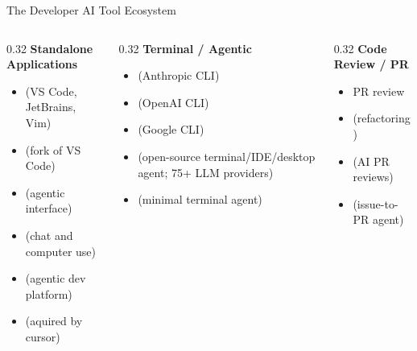 \begin{frame}[shrink=5]{The Developer AI Tool Ecosystem}
  \begin{columns}[T, onlytextwidth]
    \begin{column}{0.32\textwidth}
      \textbf{Standalone Applications}\\[0.3em]
      \begin{itemize}
        \item {} (VS Code, JetBrains, Vim)
        \item {} (fork of VS Code)
        \item {} (agentic interface)
        \item {} (chat and computer use)
        \item {} (agentic dev platform)
        \item \sout{} (aquired by cursor)
      \end{itemize}
    \end{column}
    \hfill
    \begin{column}{0.32\textwidth}
      \textbf{Terminal / Agentic}\\[0.3em]
      \begin{itemize}
        \item {} (Anthropic CLI)
        \item {} (OpenAI CLI)
        \item {} (Google CLI)
        \item {} (open-source terminal/IDE/desktop agent; 75+ LLM providers)
        \item {} (minimal terminal agent)
      \end{itemize}
    \end{column}
    \hfill
    \begin{column}{0.32\textwidth}
      \textbf{Code Review / PR}\\[0.3em]
      \begin{itemize}
        \item {} PR review
        \item {} (refactoring)
        \item {} (AI PR reviews)
        \item {} (issue-to-PR agent)
      \end{itemize}
    \end{column}
  \end{columns}
\end{frame}

